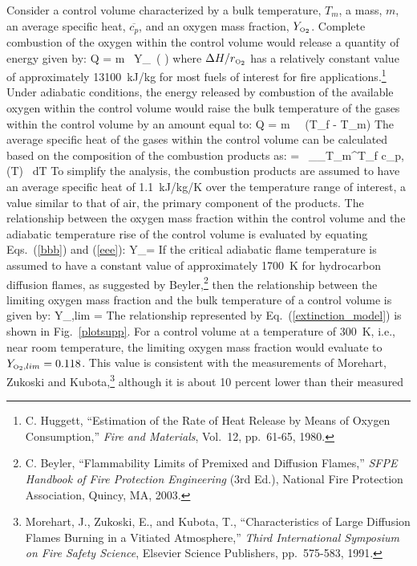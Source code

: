 \documentclass[11pt]{book}
\begin{document}
Consider a control volume characterized
by a bulk temperature, $T_m$, a mass, $m$, an average specific heat, $\overline{c_p}$, and an oxygen mass
fraction, $Y_{\tiny \hbox{O}_2}$.  Complete combustion of the oxygen within the control volume would release a
quantity of energy given by:
\be
   Q = m \, Y_\OTWO \, \left(   \right)  \label{bbb}
\ee
where $\Delta H/r_{\tiny \hbox{O}_2}$ has a relatively constant value of
approximately 13100~kJ/kg for most fuels of interest for fire applications.\footnote{C. Huggett, ``Estimation of the Rate of Heat Release by Means of Oxygen
Consumption,'' {\em Fire and Materials}, Vol.~12, pp.~61-65, 1980.}
Under adiabatic conditions, the energy released by combustion of the available oxygen within
the control volume would raise the bulk temperature of the gases within the control volume by an
amount equal to:
\be
   Q = m \,  \, (T_f - T_m)  \label{eee}
\ee
The average specific heat of the gases within the control volume can be calculated based on the
composition of the combustion products as:
\be
    =  \, \sum_\alpha \int_{T_m}^{T_f} c_{p,\alpha} (T) \, dT
\ee
To simplify the analysis, the combustion products are assumed to have an average specific heat
of 1.1~kJ/kg/K over the temperature range of interest, a value similar to that of air, the primary
component of the products.
The relationship between the oxygen mass fraction within the control volume and the adiabatic
temperature rise of the control volume is evaluated by equating Eqs.~(\ref{bbb}) and (\ref{eee}):
\be
   Y_\OTWO = 
\ee
If the critical adiabatic flame temperature is assumed to have a constant value of approximately
1700~K for hydrocarbon diffusion flames, as suggested by Beyler,\footnote{C. Beyler, ``Flammability Limits of Premixed and Diffusion Flames,''
{\em SFPE Handbook of Fire Protection Engineering} (3rd Ed.), National Fire
Protection Association, Quincy, MA, 2003.} then the relationship
between the limiting oxygen mass fraction and the bulk temperature of a control volume is given
by:
\be
   Y_{\OTWO,lim} =  \approx  {}  \label{extinction_model}
\ee
The relationship represented by Eq.~(\ref{extinction_model}) is shown in Fig.~\ref{plotsupp}.
For a control volume at a temperature of 300~K, i.e., near room temperature, the limiting oxygen
mass fraction would evaluate to $Y_{{\tiny \hbox{O}_2},lim}=0.118$.  This value is consistent with the measurements
of Morehart, Zukoski and Kubota,\footnote{Morehart, J., Zukoski, E., and Kubota, T., ``Characteristics of Large Diffusion Flames
Burning in a Vitiated Atmosphere,'' {\em Third International Symposium on Fire Safety
Science}, Elsevier Science Publishers, pp.~575-583, 1991.} although it is about 10 percent lower than their measured
\end{document}
